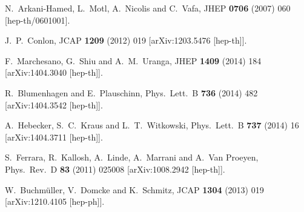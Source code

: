 \begin{thebibliography}{10}
  N.~Arkani-Hamed, L.~Motl, A.~Nicolis and C.~Vafa,
  JHEP {\bf 0706} (2007) 060
  [hep-th/0601001].


  J.~P.~Conlon,
  JCAP {\bf 1209} (2012) 019
  [arXiv:1203.5476 [hep-th]].


  F.~Marchesano, G.~Shiu and A.~M.~Uranga,
  JHEP {\bf 1409} (2014) 184
  [arXiv:1404.3040 [hep-th]].


  R.~Blumenhagen and E.~Plauschinn,
  Phys.\ Lett.\ B {\bf 736} (2014) 482
  [arXiv:1404.3542 [hep-th]].


  A.~Hebecker, S.~C.~Kraus and L.~T.~Witkowski,
  Phys.\ Lett.\ B {\bf 737} (2014) 16
  [arXiv:1404.3711 [hep-th]].


  S.~Ferrara, R.~Kallosh, A.~Linde, A.~Marrani and A.~Van Proeyen,
  Phys.\ Rev.\ D {\bf 83} (2011) 025008
  [arXiv:1008.2942 [hep-th]].


  W.~Buchmüller, V.~Domcke and K.~Schmitz,
  JCAP {\bf 1304} (2013) 019
  [arXiv:1210.4105 [hep-ph]].



\end{thebibliography}
